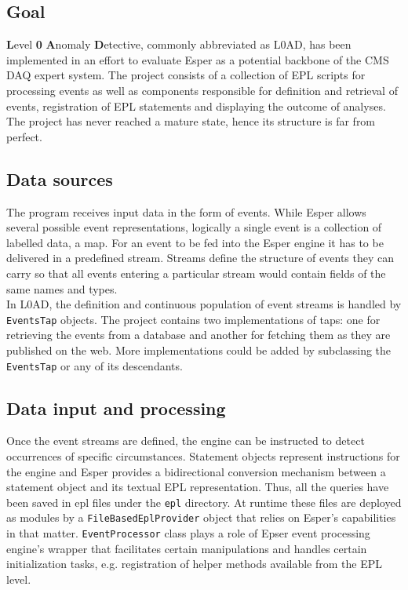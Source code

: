 \subsection {Goal}
\textbf{L}evel \textbf{0} \textbf{A}nomaly \textbf{D}etective, commonly abbreviated as L0AD, has been implemented in an effort to evaluate Esper as a potential backbone of the CMS DAQ expert system. The project consists of a collection of EPL scripts for processing events as well as components responsible for definition and retrieval of events, registration of EPL statements and displaying the outcome of analyses.
The project has never reached a mature state, hence its structure is far from perfect.
\subsection{Data sources}
The program receives input data in the form of events. While Esper allows several possible event representations, logically a single event is a collection of labelled data, a map. For an event to be fed into the Esper engine it has to be delivered in a predefined stream. Streams define the structure of events they can carry so that all events entering a particular stream would contain fields of the same names and types. \\

In L0AD, the definition and continuous population of event streams is handled by \texttt{EventsTap} objects. The project contains two implementations of taps: one for retrieving the events from a database and another for fetching them as they are published on the web. More implementations could be added by subclassing the \texttt{EventsTap} or any of its descendants.

\subsection{Data input and processing}

Once the event streams are defined, the engine can be instructed to detect occurrences of specific circumstances. Statement objects represent instructions for the engine and Esper provides a bidirectional conversion mechanism between a statement object and its textual EPL representation. Thus, all the queries have been saved in epl files under the \texttt{epl} directory. At runtime these files are deployed as modules by a \texttt{FileBasedEplProvider} object that relies on Esper's capabilities in that matter. \texttt{EventProcessor} class plays a role of Epser event processing engine's wrapper that facilitates certain manipulations and handles certain initialization tasks, e.g. registration of helper methods available from the EPL level.


